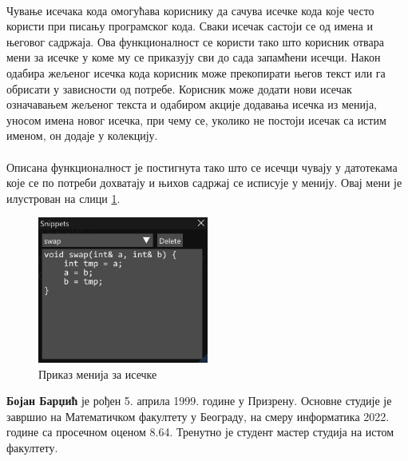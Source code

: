 \documentclass[12pt,oneside]{memoir}
\begin{document}
\paragraph{}
Чување исечака кода омогућава кориснику да сачува
исечке кода које често користи при писању програмског кода. Сваки исечак састоји се од имена и његовог садржаја. Ова функционалност се користи тако
што корисник отвара мени за исечке у коме му се приказују сви до сада
запамћени исечци. Након одабира жељеног исечка кода корисник може прекопирати његов текст или га обрисати у зависности од потребе. Корисник може додати нови исечак означавањем жељеног текста и одабиром акције додавања исечка из менија, 
уносом имена новог исечка, при чему се, уколико не постоји исечак
са истим именом, он додаје у колекцију. 

\paragraph{}
Описана функционалност је постигнута тако што се исечци чувају у датотекама које се по потреби дохватају и њихов садржај се исписује у менију. Овај мени
је илустрован на слици \ref{fig:code_snippets}.

\begin{figure}[!ht]
	\centering
	\includegraphics[width=0.5\textwidth]{images/code_snippets.png}
	\caption{Приказ менија за исечке}
	\label{fig:code_snippets}
\end{figure} 
\literatura

\backmatter

\begin{biografija}
\textbf{Бојан Барџић} је рођен 5. априла 1999. године у Призрену. Основне студије
је завршио на Математичком факултету у Београду, на смеру информатика 2022. године
са просечном оценом 8.64. Тренутно је студент мастер студија на истом факултету.
\end{biografija}
\end{document}
